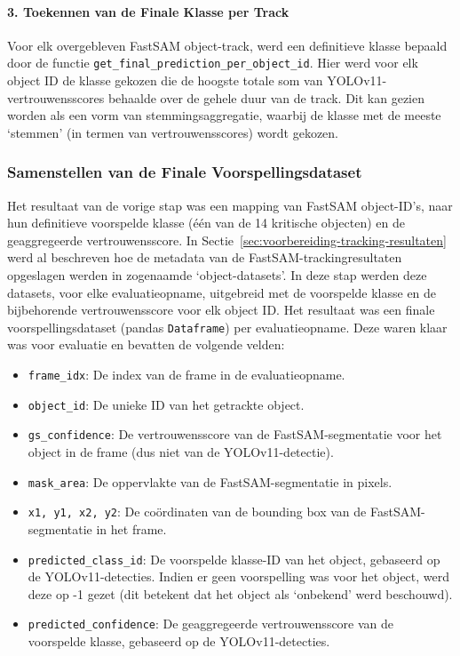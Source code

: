 \paragraph{3. Toekennen van de Finale Klasse per Track}
Voor elk overgebleven FastSAM object-track, werd een definitieve klasse bepaald door de functie \texttt{get\_final\_prediction\_per\_object\_id}. 
Hier werd voor elk object ID de klasse gekozen die de hoogste totale som van YOLOv11-vertrouwensscores 
behaalde over de gehele duur van de track. 
Dit kan gezien worden als een vorm van stemmingsaggregatie, 
waarbij de klasse met de meeste `stemmen' (in termen van vertrouwensscores) wordt gekozen.

\subsubsection{Samenstellen van de Finale Voorspellingsdataset}
Het resultaat van de vorige stap was een mapping van FastSAM object-ID's, 
naar hun definitieve voorspelde klasse (één van de 14 kritische objecten) 
en de geaggregeerde vertrouwensscore.
In Sectie~\ref{sec:voorbereiding-tracking-resultaten} werd al beschreven hoe de metadata van de FastSAM-trackingresultaten opgeslagen werden in zogenaamde `object-datasets'.
In deze stap werden deze datasets, voor elke evaluatieopname, uitgebreid met de voorspelde klasse en de bijbehorende vertrouwensscore voor elk object ID.
Het resultaat was een finale voorspellingsdataset (pandas \texttt{Dataframe}) per evaluatieopname. Deze waren klaar was voor evaluatie en bevatten de volgende velden:
\begin{itemize}
    \item \texttt{frame\_idx}: De index van de frame in de evaluatieopname.
    \item \texttt{object\_id}: De unieke ID van het getrackte object.
    \item \texttt{gs\_confidence}: De vertrouwensscore van de FastSAM-segmentatie voor het object in de frame (dus niet van de YOLOv11-detectie).
    \item \texttt{mask\_area}: De oppervlakte van de FastSAM-segmentatie in pixels.
    \item \texttt{x1, y1, x2, y2}: De coördinaten van de bounding box van de FastSAM-segmentatie in het frame.
    \item \texttt{predicted\_class\_id}: De voorspelde klasse-ID van het object, gebaseerd op de YOLOv11-detecties.
    Indien er geen voorspelling was voor het object, werd deze op -1 gezet (dit betekent dat het object als `onbekend' werd beschouwd).
    \item \texttt{predicted\_confidence}: De geaggregeerde vertrouwensscore van de voorspelde klasse, gebaseerd op de YOLOv11-detecties.
\end{itemize}

